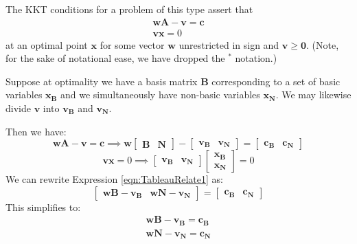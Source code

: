 The KKT conditions for a problem of this type assert that
\begin{gather*}
\mathbf{w}\mathbf{A} - \mathbf{v} = \mathbf{c}\\
\mathbf{v}\mathbf{x}= 0
\end{gather*}
at an optimal point $\mathbf{x}$ for some vector $\mathbf{w}$ unrestricted in sign and $\mathbf{v} \geq \mathbf{0}$. (Note, for the sake of notational ease, we have dropped the $^*$ notation.)

Suppose at optimality we have a basis matrix $\mathbf{B}$ corresponding to a set of basic variables $\mathbf{x}_\mathbf{B}$ and we simultaneously have non-basic variables $\mathbf{x}_\mathbf{N}$. We may likewise divide $\mathbf{v}$ into $\mathbf{v}_\mathbf{B}$ and $\mathbf{v}_\mathbf{N}$. 

Then we have:
\begin{equation}
\mathbf{w}\mathbf{A} - \mathbf{v} = \mathbf{c} \implies 
\mathbf{w}\begin{bmatrix}\mathbf{B} & \mathbf{N}\end{bmatrix} - \begin{bmatrix}\mathbf{v}_\mathbf{B} & \mathbf{v}_\mathbf{N}\end{bmatrix} = 
\begin{bmatrix}\mathbf{c}_\mathbf{B} & \mathbf{c}_\mathbf{N}\end{bmatrix}\label{eqn:TableauRelate1}
\end{equation}
\begin{equation}
\mathbf{v}\mathbf{x} = 0 \implies 
\begin{bmatrix}\mathbf{v}_\mathbf{B} & \mathbf{v}_\mathbf{N}
\end{bmatrix}
\begin{bmatrix}\mathbf{x}_\mathbf{B}\\
\mathbf{x}_\mathbf{N}
\end{bmatrix} = 0\label{eqn:TableauRelate2}
\end{equation}
We can rewrite Expression \ref{eqn:TableauRelate1} as:
\begin{equation}
\begin{bmatrix}
\mathbf{w}\mathbf{B}-\mathbf{v}_\mathbf{B} & 
\mathbf{w}\mathbf{N}-\mathbf{v}_\mathbf{N}
\end{bmatrix} =
\begin{bmatrix}
\mathbf{c}_\mathbf{B} & \mathbf{c}_\mathbf{N}
\end{bmatrix}
\end{equation}
This simplifies to:
\begin{gather*}
\mathbf{w}\mathbf{B} - \mathbf{v}_\mathbf{B} = \mathbf{c}_\mathbf{B}\\
\mathbf{w}\mathbf{N} - \mathbf{v}_\mathbf{N} = \mathbf{c}_\mathbf{N}\\
\end{gather*}
